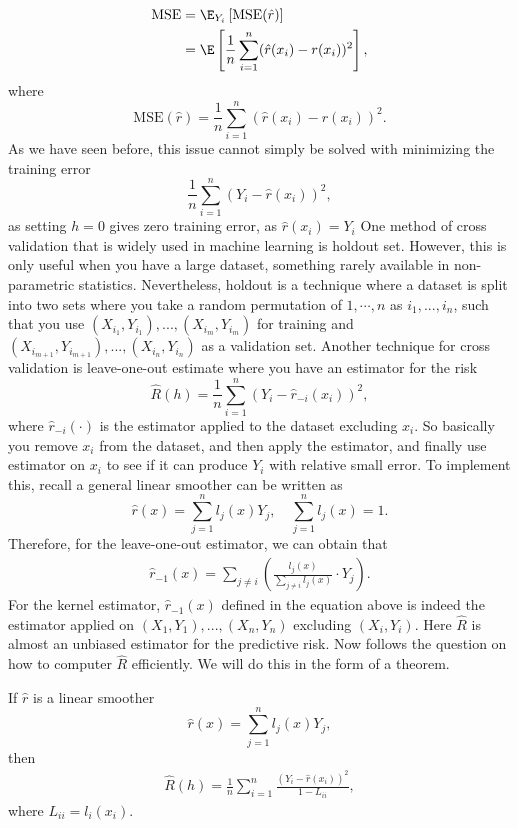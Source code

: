 \begin{align*}
\mathrm{MSE} &= \E_{Y_i} \left[\mathrm{MSE}(\hat r)\right] \nonumber \\
& =  \E \left[\frac{1}{n}\sum_{i=1}^{n}(\hat{r}(x_i) - r(x_i))^2\right] ,
\end{align*}
where
 \[
\mathrm{MSE}(\hat r) = \frac{1}{n}\sum_{i=1}^{n}(\hat{r}(x_i) - r(x_i))^2.
\]
As we have seen before, this issue cannot simply be solved with minimizing the training error
\[
\frac{1}{n} \sum_{i = 1}^{n} (Y_i - \hat{r}(x_i))^2,
\]
as setting $h=0$ gives zero training error, as $\hat{r}(x_i) = Y_i$
One method of cross validation that is widely used in machine learning is holdout set. However, this is only useful when you have a large dataset, something rarely available in non-parametric statistics. Nevertheless, holdout is a technique where a dataset is split into two sets where you take a random permutation of $1,\cdots, n$ as $i_1,...,i_n$, such that you use $(X_{i_1}, Y_{i_1}),..., (X_{i_m}, Y_{i_m})$ for training and $(X_{i_{m+1}}, Y_{i_{m+1}}),..., (X_{i_n}, Y_{i_n})$ as a validation set.
Another technique for cross validation is leave-one-out estimate where you have an estimator for the risk
\[
\hat{R}(h) = \frac{1}{n} \sum_{i = 1}^{n}(Y_i - \hat{r}_{-i}(x_i))^2,
\]
where $\hat{r}_{-i}(\cdot)$ is the estimator applied to the dataset excluding $x_i$. So basically you remove $x_i$ from the dataset, and then apply the estimator, and finally use estimator on $x_i$ to see if it can produce $Y_i$ with relative small error. To implement this, recall a general linear smoother can be written as
\[
\hat{r}(x) = \sum_{j = 1}^{n} l_j(x) Y_j, \quad \sum_{j=1}^n l_j(x) = 1.
\]
Therefore, for the leave-one-out estimator, we can obtain that
\begin{align*}
    \hat{r}_{-1}(x) = \sum_{j \not = i} \left( \frac{ l_j(x) }{\sum_{j \not = i} l_j(x)} \cdot Y_j \right).
  \end{align*}
For the kernel estimator, $\hat{r}_{-1}(x)$ defined in the equation above is indeed the estimator applied on $(X_{1}, Y_{1}),..., (X_{n}, Y_{n})$ excluding $(X_{i}, Y_{i})$. Here $\hat{R}$ is almost an unbiased estimator for the predictive risk. Now follows the question on how to computer $\hat{R}$ efficiently. We will do this in the form of a theorem.
\begin{theorem}
	If $\hat{r}$ is a linear smoother \[
	\hat{r}(x) = \sum_{j =1}^{n} l_j(x) Y_j,
	\]
	then
	\begin{align}
	\hat{R}(h) = \frac{1}{n}\sum_{i=1}^{n} \frac{(Y_i - \hat{r}(x_i))^2}{1 - L_{ii}},
	\end{align}
	where $L_{ii} = l_i(x_i)$. 
\end{theorem}
